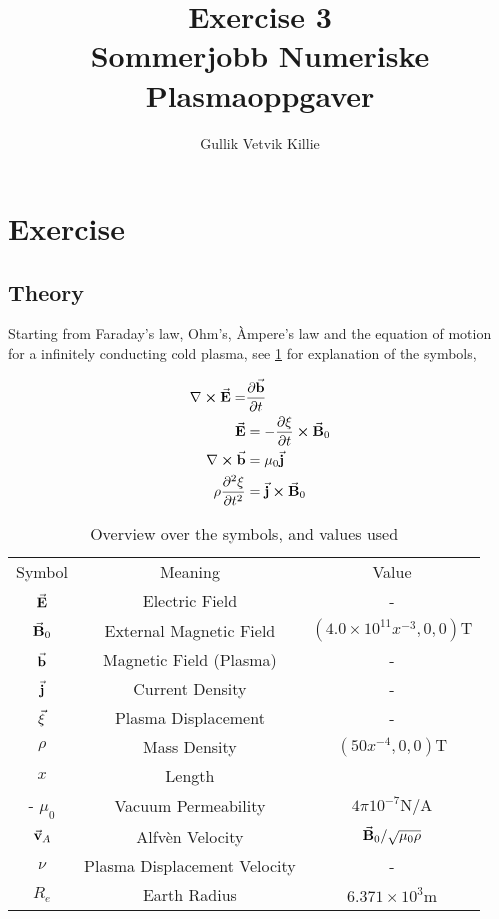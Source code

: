 \documentclass[x11names]{article}
\title{ Exercise 3 \\ Sommerjobb Numeriske Plasmaoppgaver }
\author{Gullik Vetvik Killie
		}
\begin{document}
\maketitle

\section{Exercise}

\subsection{Theory}
  Starting from Faraday's law, Ohm's, Àmpere's law and the equation of motion for a infinitely conducting cold plasma, see \cref{tab:symbols} for explanation of the symbols,

  \begin{align}
    \nabla \cross \va{E} =& \pdv{\va{b}}{t} \label{eq:Faraday}
    \\
    \va{E} &= -\pdv{\xi}{t} \cross \va{B}_0 \label{eq:Ohm}
    \\
    \nabla \cross \va{b}  &= \mu_0\va{j}  \label{eq:Ampere}
    \\
    \rho \pdv[2]{\xi}{t} &= \va{j} \cross \va{B}_0 \label{eq:EOM}
  \end{align}

  \begin{table}
            \centering
            \begin{tabular}{| c | c | c |}
                 Symbol & Meaning & Value
                 \\
                 $\va{E}$ & Electric Field  & -
                 \\
                 $\va{B}_0$ & External Magnetic Field & \((4.0\times10^{11}x^{-3}, 0, 0) \si{\tesla}\)
                 \\
                 $\va{b}$ & Magnetic Field (Plasma) & -
                 \\
                 $\va{j}$ & Current Density & -
                 \\
                 $\va{\xi}$ & Plasma Displacement & -
                 \\
                 $\rho $ & Mass Density & \((50x^{-4}, 0, 0) \si{\tesla}\)
                 \\
                 $ x $  & Length  \\ -
                 $\mu_0 $ & Vacuum Permeability & $ 4\pi10^{-7} \si{\newton\per\ampere} $
                 \\
                 $\va{v}_A$ &  Alfvèn Velocity & $ \va{B}_0/\sqrt{\mu_0\rho}$ 
                 \\
                 $\nu$  & Plasma Displacement Velocity  & -
                 \\
                 $R_e$ & Earth Radius & $6.371\times 10^3 \si{\meter}$
            \end{tabular}
            \caption{Overview over the symbols, and values used}
            \label{tab:symbols}
      \end{table}
\end{document}
